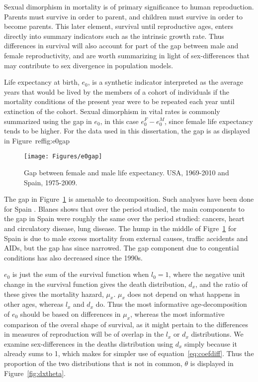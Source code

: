  \FloatBarrier
Sexual dimorphism in mortality is of primary significance to human reproduction.
Parents must survive in order to parent, and children must survive in order to
become parents. This later element, survival until reproductive ages, enters
directly into summary indicators such as the intrinsic growth rate. Thus
differences in survival will also account for part of the gap between male and
female reproductivity, and are worth summarizing in light of sex-differences
that may contribute to sex divergence in population models.

Life expectancy at birth, $e_0$, is a synthetic indicator interpreted as the
average years that would be lived by the members of a cohort of individuals if
the mortality conditions of the present year were to be repeated each year until extinction of
the cohort. Sexual dimorphism in vital rates is commonly summarized using the
gap in $e_0$, in this case $e_0^F - e_0^M$, since female life expectancy tends
to be higher. For the data used in this dissertation, the gap is as displayed in
Figure~ref{fig:e0gap}

\begin{figure}[!ht]
  \centering
    \caption{Gap between female and male life expectancy. USA,
    1969-2010 and Spain, 1975-2009.}
     \texttt{[image: Figures/e0gap]}
     \label{fig:e0gap}
\end{figure}

The gap in Figure~\ref{fig:e0gap} is amenable to decomposition. Such analyses
have been done for Spain \citep[pp 217-218 and 447]{amand2007thesis}. Blanes
shows that over the period studied, the main components to the gap in
Spain were roughly the same over the period studied: cancers, heart
and circulatory disease, lung disease. The hump in the middle of
Figre~\ref{fig:e0gap} for Spain is due to male excess mortality from external
causes, traffic accidents and AIDs, but the gap has since narrowed. The gap
component due to congential conditions has also decreased since the 1990s.



$e_0$ is just the sum of the survival function when $l_0 = 1$, where the
negative unit change in the survival function gives the death distribution,
$d_x$, and the ratio of these gives the mortality hazard, $\mu _x$. $\mu_x$ does
not depend on what happens in other ages, whereas $l_x$ and $d_x$ do. Thus the
most informative age-decomposition of $e_0$ should be based on differences in
$\mu _x$, whereas the most informative comparison of the overal shape of
survival, as it might pertain to the differences in measures of reproduction
will be of overlap in the $l_x$ or $d_x$ distributions. We examine
sex-differences in the deaths distribution using $d_x$ simply
because it already sums to 1, which makes for simpler use of
equation~\eqref{eq:coefdiff}. Thus the proportion of the two distributions that
is not in common, $\theta$ is displayed in Figure~\ref{fig:dxtheta}.

